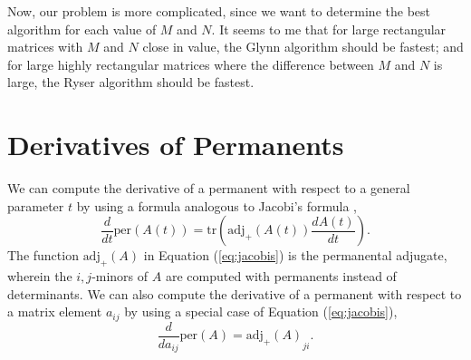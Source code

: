 \documentclass{article}
\begin{document}
Now, our problem is more complicated, since we want to determine the best algorithm for each value
of $M$ and $N$. It seems to me that for large rectangular matrices with $M$ and $N$ close in value,
the Glynn algorithm should be fastest; and for large highly rectangular matrices where the
difference between $M$ and $N$ is large, the Ryser algorithm should be fastest.

\section*{Derivatives of Permanents}

We can compute the derivative of a permanent with respect to a general parameter $t$ by using
a formula analogous to Jacobi's formula \cite{carvalho2014},
\begin{equation} \label{eq:jacobis}
    \frac{d}{dt}\text{per}(A(t)) = \text{tr}\left(\text{adj}_{+}(A(t))\frac{dA(t)}{dt}\right).
\end{equation}
The function $\text{adj}_{+}(A)$ in Equation (\ref{eq:jacobis}) is the permanental adjugate, wherein
the $i,j$-minors of $A$ are computed with permanents instead of determinants.  We can also compute
the derivative of a permanent with respect to a matrix element $a_{ij}$ by using a special case of
Equation (\ref{eq:jacobis}),
\begin{equation}
    \frac{d}{d{a_{ij}}}\text{per}(A) = {\text{adj}_{+}(A)}_{ji}.
\end{equation}

\pagebreak



\end{document}

